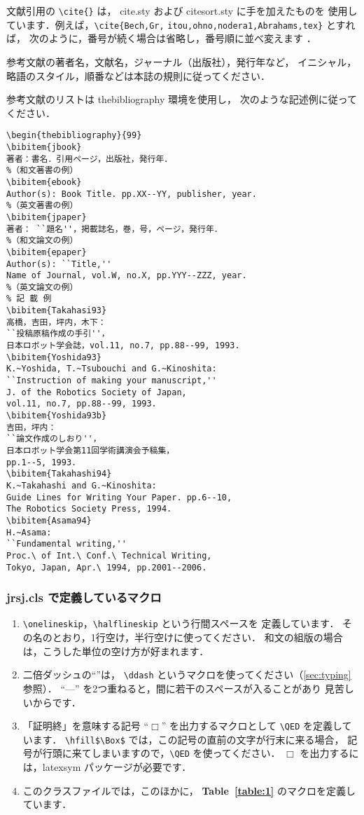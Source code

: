\documentclass[paper]{jrsj}    %
\def\JRSJcls{{\ttfamily jrsj.cls}}
\begin{document}
文献引用の \verb/\cite{}/ は，
{\ttfamily cite.sty} および {\ttfamily citesort.sty} に手を加えたものを
使用しています．例えば，\verb/\cite{Bech,Gr,/\allowbreak
 \verb/itou,ohno,nodera1,Abrahams,tex}/ とすれば，
次のように，番号が続く場合は省略し，番号順に並べ変えます
\cite{Bech,Gr,itou,ohno,nodera1,Abrahams,tex}．

参考文献の著者名，文献名，ジャーナル（出版社），発行年など，
イニシャル，略語のスタイル，順番などは本誌の規則に従ってください．

参考文献のリストは thebibliography 環境を使用し，
次のような記述例に従ってください．

\begin{verbatim}
\begin{thebibliography}{99}
\bibitem{jbook}
著者：書名．引用ページ，出版社，発行年．
%（和文著書の例）
\bibitem{ebook}
Author(s): Book Title. pp.XX--YY, publisher, year. 
%（英文著書の例）
\bibitem{jpaper}
著者： ``題名''，掲載誌名，巻，号，ページ，発行年．
%（和文論文の例）
\bibitem{epaper}
Author(s): ``Title,'' 
Name of Journal, vol.W, no.X, pp.YYY--ZZZ, year. 
%（英文論文の例）
% 記 載 例
\bibitem{Takahasi93}
高橋，吉田，坪内，木下：
``投稿原稿作成の手引''，
日本ロボット学会誌，vol.11, no.7, pp.88--99, 1993. 
\bibitem{Yoshida93}
K.~Yoshida, T.~Tsubouchi and G.~Kinoshita: 
``Instruction of making your manuscript,'' 
J. of the Robotics Society of Japan, 
vol.11, no.7, pp.88--99, 1993.  
\bibitem{Yoshida93b}
吉田，坪内： 
``論文作成のしおり''，
日本ロボット学会第11回学術講演会予稿集，
pp.1--5, 1993. 
\bibitem{Takahashi94}
K.~Takahashi and G.~Kinoshita: 
Guide Lines for Writing Your Paper. pp.6--10, 
The Robotics Society Press, 1994.
\bibitem{Asama94} 
H.~Asama: 
``Fundamental writing,'' 
Proc.\ of Int.\ Conf.\ Technical Writing, 
Tokyo, Japan, Apr.\ 1994, pp.2001--2006.
\end{verbatim}

\subsubsection{\JRSJcls{} で定義しているマクロ}

\begin{enumerate}
\item
\verb/\onelineskip/，\verb/\halflineskip/ という行間スペースを
定義しています．
その名のとおり，1行空け，半行空けに使ってください．
和文の組版の場合は，こうした単位の空け方が好まれます．

\item
二倍ダッシュの``\ddash ''は，
\verb/\ddash/ というマクロを使ってください（\ref{sec:typing} 参照）．
``---'' を2つ重ねると，間に若干のスペースが入ることがあり
見苦しいからです．

\item
「証明終」を意味する記号 ``$\Box$'' を出力するマクロとして
\verb/\QED/ を定義しています\cite{tex}．
\verb/\hfill$\Box$/ では，この記号の直前の文字が行末に来る場合，
記号が行頭に来てしまいますので，\verb/\QED/ を使ってください．
$\Box$ を出力するには，{\ttfamily latexsym} パッケージが必要です．

\item
このクラスファイルでは，このほかに，
{\bfseries Table~\ref{table:1}} のマクロを定義しています．
\end{enumerate}
\end{document}
